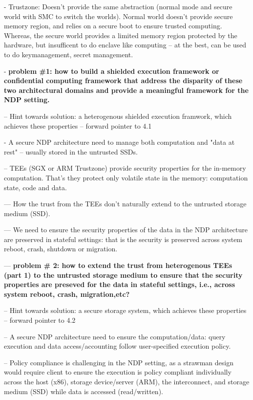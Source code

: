 - Trustzone: Doesn't provide the same abstraction (normal mode and secure world  with SMC to switch the worlds). Normal world doesn't provide secure memory region, and relies on a secure boot to ensure trusted computing. Whereas, the secure world provides a limited memory region protected by the hardware, but insufficent to do enclave like computing -- at the best, can be used to do keymanagement, secret management.


- {\bf problem \#1: how to build a shielded execution framework or confidential computing framework that address the disparity of these two architectural domains and provide a meaningful framework for the NDP setting. }


-- Hint towards solution: a heterogenous shielded execution framwork, which achieves these properties -- forward pointer to 4.1




- A secure NDP architecture need to manage both computation and "data at rest" -- usually stored in the untrusted SSDs.


-- TEEs (SGX or ARM Trustzone) provide security properties for the in-memory computation. That's they protect only volatile state in the memory: computation state, code and data.

--- How the trust from the TEEs don't naturally extend to the untrusted storage medium (SSD). 

--- We need to ensure the security properties of the data in the NDP architecture are preserved in stateful settings: that is the security is preserved across system reboot, crash, shutdown or migration. 

--- {\bf problem \# 2: how to extend the trust from heterogenous TEEs (part 1) to the untrusted storage medium to ensure that the security properties are preseved for the data in stateful settings, i.e., across system reboot, crash, migration,etc? }

-- Hint towards solution: a secure storage system, which achieves these properties -- forward pointer to 4.2




-- A secure NDP architecture need to ensure the computation/data: query execution and data access/accounting follow user-specified execution policy.

-- Policy compliance is challenging in the NDP setting, as a strawman design would require client to ensure the execution is policy compliant individually across the host (x86), storage device/server (ARM), the interconnect, and storage medium (SSD) while data is accessed (read/written). 

